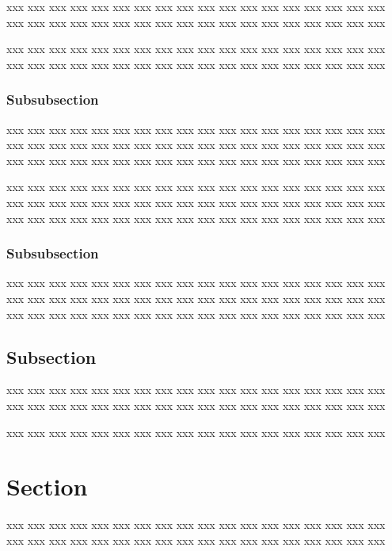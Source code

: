 \documentclass[10pt,twoside%
	]{article}
\begin{document}
xxx xxx xxx xxx xxx xxx xxx xxx xxx xxx xxx xxx xxx xxx xxx xxx xxx xxx 
xxx xxx xxx xxx xxx xxx xxx xxx xxx xxx xxx xxx xxx xxx xxx xxx xxx xxx 

xxx xxx xxx xxx xxx xxx xxx xxx xxx xxx xxx xxx xxx xxx xxx xxx xxx xxx 
xxx xxx xxx xxx xxx xxx xxx xxx xxx xxx xxx xxx xxx xxx xxx xxx xxx xxx 

\subsubsection{Subsubsection}
\label{s:subsubsection}
xxx xxx xxx xxx xxx xxx xxx xxx xxx xxx xxx xxx xxx xxx xxx xxx xxx xxx 
xxx xxx xxx xxx xxx xxx xxx xxx xxx xxx xxx xxx xxx xxx xxx xxx xxx xxx 
xxx xxx xxx xxx xxx xxx xxx xxx xxx xxx xxx xxx xxx xxx xxx xxx xxx xxx 

xxx xxx xxx xxx xxx xxx xxx xxx xxx xxx xxx xxx xxx xxx xxx xxx xxx xxx 
xxx xxx xxx xxx xxx xxx xxx xxx xxx xxx xxx xxx xxx xxx xxx xxx xxx xxx 
xxx xxx xxx xxx xxx xxx xxx xxx xxx xxx xxx xxx xxx xxx xxx xxx xxx xxx 

\subsubsection{Subsubsection}
xxx xxx xxx xxx xxx xxx xxx xxx xxx xxx xxx xxx xxx xxx xxx xxx xxx xxx 
xxx xxx xxx xxx xxx xxx xxx xxx xxx xxx xxx xxx xxx xxx xxx xxx xxx xxx 
xxx xxx xxx xxx xxx xxx xxx xxx xxx xxx xxx xxx xxx xxx xxx xxx xxx xxx 


\subsection{Subsection}

xxx xxx xxx xxx xxx xxx xxx xxx xxx xxx xxx xxx xxx xxx xxx xxx xxx xxx 
xxx xxx xxx xxx xxx xxx xxx xxx xxx xxx xxx xxx xxx xxx xxx xxx xxx xxx 

xxx xxx xxx xxx xxx xxx xxx xxx xxx xxx xxx xxx xxx xxx xxx xxx xxx xxx 



\section{Section}
\label{s:section}

xxx xxx xxx xxx xxx xxx xxx xxx xxx xxx xxx xxx xxx xxx xxx xxx xxx xxx 
xxx xxx xxx xxx xxx xxx xxx xxx xxx xxx xxx xxx xxx xxx xxx xxx xxx xxx 
\end{document}

